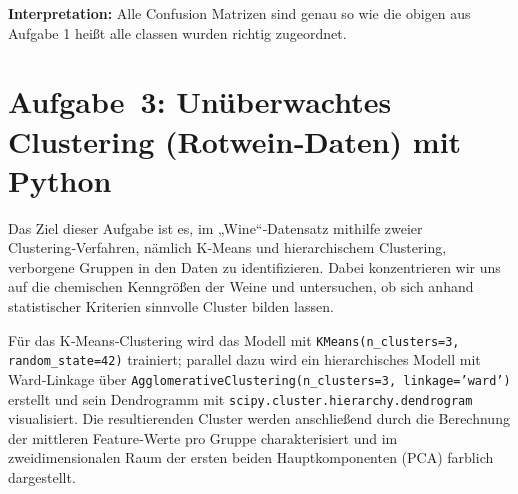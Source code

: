 \documentclass[a4paper,12pt]{scrartcl}
\begin{document}
\textbf{Interpretation:} Alle Confusion Matrizen sind genau so wie die obigen aus Aufgabe 1 heißt alle classen wurden richtig zugeordnet.
\newpage


\section*{Aufgabe 3: Unüberwachtes Clustering (Rotwein‑Daten) mit Python}

Das Ziel dieser Aufgabe ist es, im „Wine“‑Datensatz mithilfe zweier Clustering‑Verfahren, nämlich K‑Means und hierarchischem Clustering, verborgene Gruppen in den Daten zu identifizieren. Dabei konzentrieren wir uns auf die chemischen Kenngrößen der Weine und untersuchen, ob sich anhand statistischer Kriterien sinnvolle Cluster bilden lassen.


Für das K‑Means‑Clustering wird das Modell mit \texttt{KMeans(n\_clusters=3, random\_state=42)} trainiert; parallel dazu wird ein hierarchisches Modell mit Ward‑Linkage über \texttt{AgglomerativeClustering(n\_clusters=3, linkage='ward')} erstellt und sein Dendrogramm mit \texttt{scipy.cluster.hierarchy.dendrogram} visualisiert. Die resultierenden Cluster werden anschließend durch die Berechnung der mittleren Feature‑Werte pro Gruppe charakterisiert und im zweidimensionalen Raum der ersten beiden Hauptkomponenten (PCA) farblich dargestellt.
\end{document}
